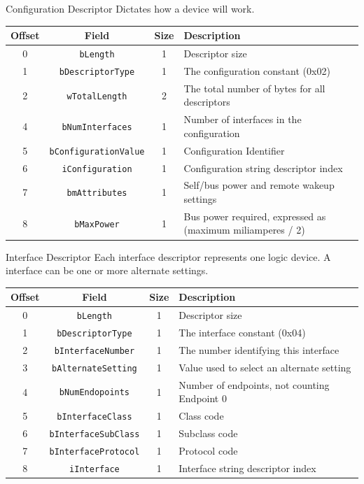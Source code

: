 \documentclass[pdf]{beamer}
\begin{document}
\begin{frame}{Configuration Descriptor}
  Dictates how a device will work.
  \begin{table}
    \tiny
    \begin{tabular}{| c | c | c | l |}
      \hline
      \textbf{Offset} & \textbf{Field} & \textbf{Size} & \textbf{Description} \\ \hline \hline
      0 & \texttt{bLength} & 1 & Descriptor size \\ \hline
      1 & \texttt{bDescriptorType} & 1 & The configuration constant (0x02) \\ \hline
      2 & \texttt{wTotalLength} & 2 & The total number of bytes for all descriptors \\ \hline
      4 & \texttt{bNumInterfaces} & 1 & Number of interfaces in the configuration \\ \hline
      5 & \texttt{bConfigurationValue} & 1 & Configuration Identifier \\ \hline
      6 & \texttt{iConfiguration} & 1 & Configuration string descriptor index \\ \hline
      7 & \texttt{bmAttributes} & 1 & Self/bus power and remote wakeup settings \\ \hline
      8 & \texttt{bMaxPower} & 1 & Bus power required, expressed as (maximum miliamperes / 2) \\ \hline
    \end{tabular}
  \end{table}
\end{frame}

\begin{frame}{Interface Descriptor}
  Each interface descriptor represents one logic device.
  A interface can be one or more alternate settings.
  \begin{table}
    \tiny
    \begin{tabular}{| c | c | c | l |}
      \hline
      \textbf{Offset} & \textbf{Field} & \textbf{Size} & \textbf{Description} \\ \hline \hline
      0 & \texttt{bLength} & 1 & Descriptor size \\ \hline
      1 & \texttt{bDescriptorType} & 1 & The interface constant (0x04) \\ \hline
      2 & \texttt{bInterfaceNumber} & 1 & The number identifying this interface \\ \hline
      3 & \texttt{bAlternateSetting} & 1 & Value used to select an alternate setting \\ \hline
      4 & \texttt{bNumEndopoints} & 1 & Number of endpoints, not counting Endpoint 0 \\ \hline
      5 & \texttt{bInterfaceClass} & 1 & Class code \\ \hline
      6 & \texttt{bInterfaceSubClass} & 1 & Subclass code \\ \hline
      7 & \texttt{bInterfaceProtocol} & 1 & Protocol code \\ \hline
      8 & \texttt{iInterface} & 1 & Interface string descriptor index \\ \hline
    \end{tabular}
  \end{table}
\end{frame}
\end{document}
